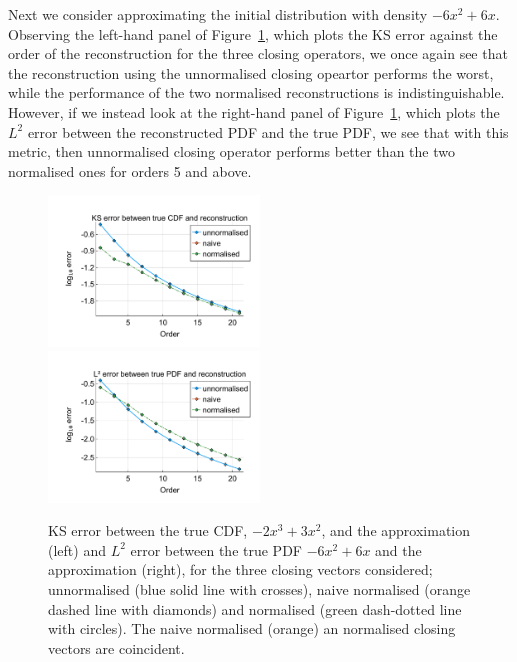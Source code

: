 Next we consider approximating the initial distribution with density \(-6x^2+6x\). Observing the left-hand panel of Figure~\ref{fig: fun 6 ks error qbdrap closing vecs}, which plots the KS error against the order of the reconstruction for the three closing operators, we once again see that the reconstruction using the unnormalised closing opeartor performs the worst, while the performance of the two normalised reconstructions is indistinguishable. However, if we instead look at the right-hand panel of Figure~\ref{fig: fun 6 ks error qbdrap closing vecs}, which plots the \(L^2\) error between the reconstructed PDF and the true PDF, we see that with this metric, then unnormalised closing operator performs better than the two normalised ones for orders 5 and above. 
\begin{figure}
	\centering
	\includegraphics[width=0.5\textwidth,trim={1.25cm 0.8cm 0.25cm 1.25cm},clip]{chapter5/figs/qbdrap_closing_vec/fun6/ks_error_formatted.pdf}%
	\includegraphics[width=0.5\textwidth,trim={1.25cm 0.8cm 0.25cm 1.25cm},clip]{chapter5/figs/qbdrap_closing_vec/fun6/l2_pdf_error_formatted.pdf}
	\caption{KS error between the true CDF, \(-2x^3+3x^2\), and the approximation (left) and \(L^2\) error between the true PDF \(-6x^2+6x\) and the approximation (right), for the three closing vectors considered; unnormalised (blue solid line with crosses), naive normalised (orange dashed line with diamonds) and normalised (green dash-dotted line with circles). The naive normalised (orange) an normalised closing vectors are coincident.}
	\label{fig: fun 6 ks error qbdrap closing vecs}
\end{figure}

